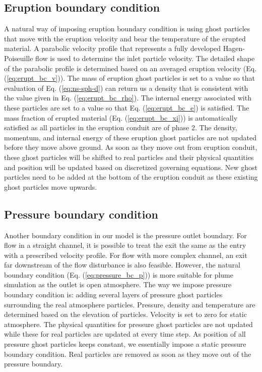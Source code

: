 \subsection{Eruption boundary condition}
A natural way of imposing eruption boundary condition is using ghost particles that move with the eruption velocity and bear the temperature of the erupted material. A parabolic velocity profile that represents a fully developed Hagen-Poiseuille flow is used to determine the inlet particle velocity. The detailed shape of the parabolic profile is determined based on an averaged eruption velocity (Eq. (\ref{eq:erupt_bc_v})). The mass of eruption ghost particles is set to a value so that evaluation of Eq. (\ref{eq:ns-sph-d}) can return us a density that is consistent with the value given in Eq. (\ref{eq:erupt_bc_rho}). 
The internal energy associated with these particles are set to a value so that Eq. (\ref{eq:erupt_bc_e}) is satisfied. The mass fraction of erupted material (Eq. (\ref{eq:erupt_bc_xi})) is automatically satisfied as all particles in the eruption conduit are of phase 2. The density, momentum, and internal energy of these eruption ghost particles are not updated before they move above ground. As soon as they move out from eruption conduit, these ghost particles will be shifted to real particles and their physical quantities and position will be updated based on discretized governing equations. New ghost particles need to be added at the bottom of the eruption conduit as these existing ghost particles move upwards.

\subsection{Pressure boundary condition}
Another boundary condition in our model is the pressure outlet boundary. For flow in a straight channel, it is possible to treat the exit the same as the entry with a prescribed velocity profile. For flow with more complex channel, an exit far downstream of the flow disturbance is also feasible. However, the natural boundary condition (Eq. (\ref{eq:pressure_bc_p})) is more suitable for plume simulation as the outlet is open atmosphere. The way we impose pressure boundary condition is: adding several layers of pressure ghost particles surrounding the real atmosphere particles. Pressure, density and temperature are determined based on the elevation of particles. Velocity is set to zero for static atmosphere. The physical quantities for pressure ghost particles are not updated while these for real particles are updated at every time step. As position of all pressure ghost particles keeps constant, we essentially impose a static pressure boundary condition. Real particles are removed as soon as they move out of the pressure boundary.

